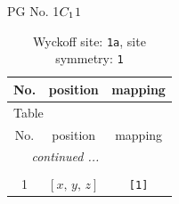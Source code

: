 \documentclass[fleqn,8pt]{jsarticle}
\begin{document}
\setcounter{MaxMatrixCols}{32}

\renewcommand{\tablename}{Table~}
\renewcommand{\figurename}{Figure~}
\begin{center}
\LARGE
PG No. 1\quad$C_{\rm 1}$\quad$1$\quad[ triclinic ]
\end{center}
\renewcommand{\arraystretch}{1.2}
\begin{longtable}{ccc}
\caption{Wyckoff site: {\tt 1a}, site symmetry: {\tt 1}}
 \\
 \hline \hline
No. & position & mapping \\ \hline \endfirsthead

\multicolumn{2}{l}{\tablename\ \thetable{}} \\
 \hline \hline
No. & position & mapping \\ \hline \endhead

 \hline \hline
\multicolumn{2}{r}{\footnotesize\it continued ...} \\ \endfoot

 \hline \hline
\multicolumn{2}{r}{} \\ \endlastfoot

1 & $\left[ x,\, y,\, z \right]$ & {\tt [1]} \\
\end{longtable}
\end{document}
